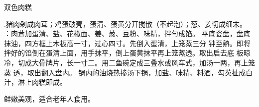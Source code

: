 \begin{recipe}[金银肉糕]{双色肉糕}

\ingredients


\cooking

\step .猪肉剁成肉茸；鸡蛋破壳，蛋清、蛋黄分开搅散（不起泡）；葱、姜切成细末。
\step ：肉茸加蛋清、盐、花椒面、姜、葱、豆粉、味精，拌勻成馅。
\step 平底瓷盘，盘底抹油，四方框上木板高一寸，过心四寸。先倒入蛋清，上笼蒸三分
钟至熟。即将拌好的馅倒在蛋清上面，用手抹平，倒上蛋黄抹平再上笼蒸透。取出启去底
板晾冷，切成大骨牌片，长一寸二。用二鱼碗定成三叠水或风车式，加汤一两，再上笼蒸
透，取出翻入盘内。
\step 锅内的油烧热掺汤下锅，加盐、味精、料酒，勾芡扯成白汁，淋上肉糕即成。

\notes

鲜嫩美观，适合老年人食用。

\end{recipe}

